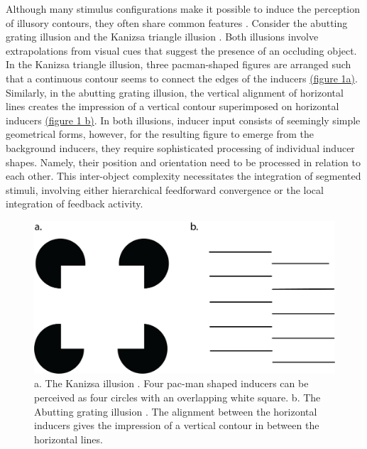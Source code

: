 \documentclass[12pt]{article}
\begin{document}
Although many stimulus configurations make it possible to induce the perception of illusory contours, they often share common features \autocite{palmerLateInfluencesPerceptual2000}. Consider the abutting grating illusion \autocite{sorianoAbuttingGratingIllusion1996} and the Kanizsa triangle illusion \autocite{kanizsaSubjectiveContours1976}. Both illusions involve extrapolations from visual cues that suggest the presence of an occluding object. In the Kanizsa triangle illusion, three pacman-shaped figures are arranged such that a continuous contour seems to connect the edges of the inducers \hyperref[fig:figure_1]{(figure 1a)}. Similarly, in the abutting grating illusion, the vertical alignment of horizontal lines creates the impression of a vertical contour superimposed on horizontal inducers \hyperref[fig:figure_1]{(figure 1 b)}. In both illusions, inducer input consists of seemingly simple geometrical forms, however, for the resulting figure to emerge from the background inducers, they require sophisticated processing of individual inducer shapes. Namely, their position and orientation need to be processed in relation to each other. This inter-object complexity necessitates the integration of segmented stimuli, involving either hierarchical feedforward convergence or the local integration of feedback activity. 

\begin{figure}[H]
  \centering
  \includegraphics[width=1.0\textwidth]{adjusted_figures/illusory_figures_kanizsa_grating.png}
  \caption{a. The Kanizsa illusion \autocite{kanizsaSubjectiveContours1976}. Four pac-man shaped inducers can be perceived as four circles with an overlapping white square. b. The Abutting grating illusion \autocite{sorianoAbuttingGratingIllusion1996}. The alignment between the horizontal inducers gives the impression of a vertical contour in between the horizontal lines.}
  \label{fig:figure_1}
\end{figure}
\end{document}
